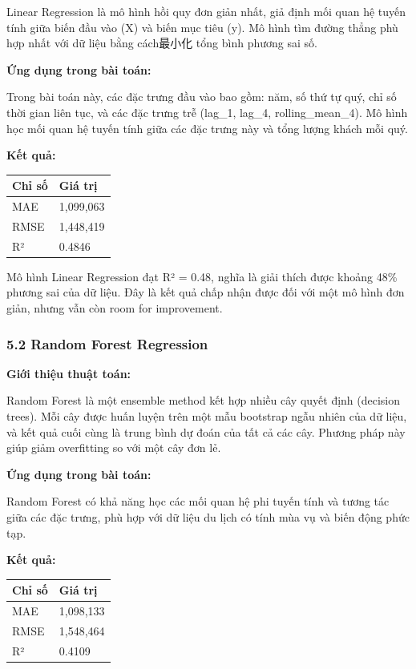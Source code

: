 \documentclass[11pt]{article}
\begin{document}
Linear Regression là mô hình hồi quy đơn giản nhất, giả định mối quan hệ
tuyến tính giữa biến đầu vào (X) và biến mục tiêu (y). Mô hình tìm đường
thẳng phù hợp nhất với dữ liệu bằng cách最小化 tổng bình phương sai số.

\textbf{Ứng dụng trong bài toán:}

Trong bài toán này, các đặc trưng đầu vào bao gồm: năm, số thứ tự quý,
chỉ số thời gian liên tục, và các đặc trưng trễ (lag\_1, lag\_4,
rolling\_mean\_4). Mô hình học mối quan hệ tuyến tính giữa các đặc trưng
này và tổng lượng khách mỗi quý.

\textbf{Kết quả:}

\begin{longtable}[]{@{}ll@{}}
\toprule\noalign{}
Chỉ số & Giá trị \\
\midrule\noalign{}
\endhead
\bottomrule\noalign{}
\endlastfoot
MAE & 1,099,063 \\
RMSE & 1,448,419 \\
R² & 0.4846 \\
\end{longtable}

Mô hình Linear Regression đạt R² = 0.48, nghĩa là giải thích được khoảng
48\% phương sai của dữ liệu. Đây là kết quả chấp nhận được đối với một
mô hình đơn giản, nhưng vẫn còn room for improvement.

\subsubsection{5.2 Random Forest
Regression}\label{random-forest-regression}

\textbf{Giới thiệu thuật toán:}

Random Forest là một ensemble method kết hợp nhiều cây quyết định
(decision trees). Mỗi cây được huấn luyện trên một mẫu bootstrap ngẫu
nhiên của dữ liệu, và kết quả cuối cùng là trung bình dự đoán của tất cả
các cây. Phương pháp này giúp giảm overfitting so với một cây đơn lẻ.

\textbf{Ứng dụng trong bài toán:}

Random Forest có khả năng học các mối quan hệ phi tuyến tính và tương
tác giữa các đặc trưng, phù hợp với dữ liệu du lịch có tính mùa vụ và
biến động phức tạp.

\textbf{Kết quả:}

\begin{longtable}[]{@{}ll@{}}
\toprule\noalign{}
Chỉ số & Giá trị \\
\midrule\noalign{}
\endhead
\bottomrule\noalign{}
\endlastfoot
MAE & 1,098,133 \\
RMSE & 1,548,464 \\
R² & 0.4109 \\
\end{longtable}
\end{document}
